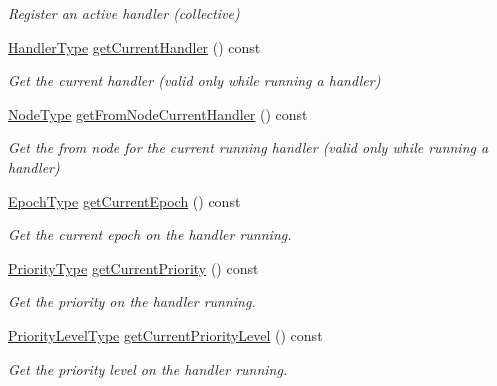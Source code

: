 \begin{DoxyCompactItemize}
\begin{DoxyCompactList}\small\item\em Register an active handler (collective) \end{DoxyCompactList}\item 
\hyperlink{namespacevt_af64846b57dfcaf104da3ef6967917573}{Handler\+Type} \hyperlink{structvt_1_1messaging_1_1_active_messenger_a80753933950fa9619a5b675e5db291ad}{get\+Current\+Handler} () const
\begin{DoxyCompactList}\small\item\em Get the current handler (valid only while running a handler) \end{DoxyCompactList}\item 
\hyperlink{namespacevt_a866da9d0efc19c0a1ce79e9e492f47e2}{Node\+Type} \hyperlink{structvt_1_1messaging_1_1_active_messenger_a433c49a43b304429aa2e046733dc8fde}{get\+From\+Node\+Current\+Handler} () const
\begin{DoxyCompactList}\small\item\em Get the from node for the current running handler (valid only while running a handler) \end{DoxyCompactList}\item 
\hyperlink{namespacevt_a985a5adf291c34a3ca263b3378388236}{Epoch\+Type} \hyperlink{structvt_1_1messaging_1_1_active_messenger_a5910d45e103a4c0e9c3a69084a58caac}{get\+Current\+Epoch} () const
\begin{DoxyCompactList}\small\item\em Get the current epoch on the handler running. \end{DoxyCompactList}\item 
\hyperlink{namespacevt_a86bff9f556eb761b27fc8600d006ac04}{Priority\+Type} \hyperlink{structvt_1_1messaging_1_1_active_messenger_a170f37d23b8cad11dac0de0dec556ef6}{get\+Current\+Priority} () const
\begin{DoxyCompactList}\small\item\em Get the priority on the handler running. \end{DoxyCompactList}\item 
\hyperlink{namespacevt_a53e07fdb3351b0f263e0dfd51b968d5e}{Priority\+Level\+Type} \hyperlink{structvt_1_1messaging_1_1_active_messenger_abfa87fe46bbb97786ba2dcd923da8c39}{get\+Current\+Priority\+Level} () const
\begin{DoxyCompactList}\small\item\em Get the priority level on the handler running. \end{DoxyCompactList}\item 

\end{DoxyCompactItemize}
